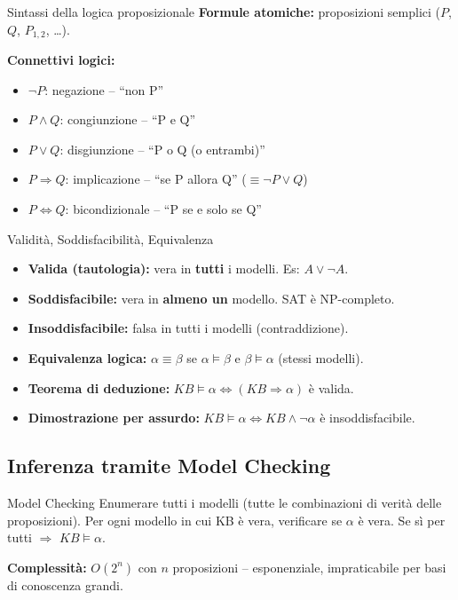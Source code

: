 \documentclass[12pt,a4paper]{article}
\begin{document}
\begin{defbox}{Sintassi della logica proposizionale}
\textbf{Formule atomiche:} proposizioni semplici ($P$, $Q$, $P_{1,2}$, \ldots).

\textbf{Connettivi logici:}
\begin{itemize}[noitemsep]
  \item $\neg P$: negazione -- ``non P''
  \item $P \land Q$: congiunzione -- ``P e Q''
  \item $P \lor Q$: disgiunzione -- ``P o Q (o entrambi)''
  \item $P \Rightarrow Q$: implicazione -- ``se P allora Q'' ($\equiv \neg P \lor Q$)
  \item $P \Leftrightarrow Q$: bicondizionale -- ``P se e solo se Q''
\end{itemize}
\end{defbox}

\begin{defbox}{Validità{,} Soddisfacibilità{,} Equivalenza}
\begin{itemize}[noitemsep]
  \item \textbf{Valida (tautologia):} vera in \textbf{tutti} i modelli. Es: $A \lor \neg A$.
  \item \textbf{Soddisfacibile:} vera in \textbf{almeno un} modello. SAT è NP-completo.
  \item \textbf{Insoddisfacibile:} falsa in tutti i modelli (contraddizione).
  \item \textbf{Equivalenza logica:} $\alpha \equiv \beta$ se $\alpha \models \beta$ e $\beta \models \alpha$ (stessi modelli).
  \item \textbf{Teorema di deduzione:} $KB \models \alpha \Leftrightarrow (KB \Rightarrow \alpha)$ è valida.
  \item \textbf{Dimostrazione per assurdo:} $KB \models \alpha \Leftrightarrow KB \land \neg\alpha$ è insoddisfacibile.
\end{itemize}
\end{defbox}

\subsection{Inferenza tramite Model Checking}

\begin{defbox}{Model Checking}
Enumerare tutti i modelli (tutte le combinazioni di verità delle proposizioni). Per ogni modello in cui KB è vera, verificare se $\alpha$ è vera. Se sì per tutti $\Rightarrow$ $KB \models \alpha$.

\textbf{Complessità:} $O(2^n)$ con $n$ proposizioni -- esponenziale, impraticabile per basi di conoscenza grandi.
\end{defbox}
\end{document}
